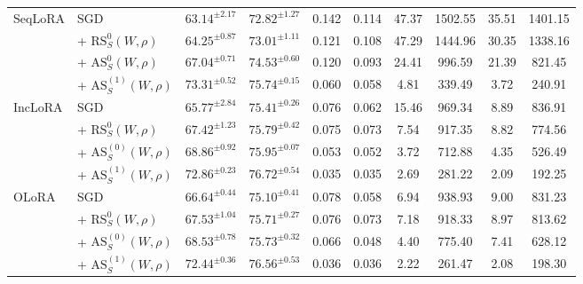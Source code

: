 \documentclass{article}
\theoremstyle{plain}
\theoremstyle{definition}
\theoremstyle{remark}
\begin{document}
{\begin{table}[ht]
{\begin{tabular}{@{}p{1.15cm} p{1.8cm} c c c c c c c c@{}}
\multirow{4}{*}{{SeqLoRA}}
& SGD    &$63.14^{\pm 2.17}$ & $72.82^{\pm 1.27}$  & 0.142  & 0.114 & 47.37 & 1502.55 & 35.51 & 1401.15 \\\
& + $\mathrm{RS}^{0}_S(W,\rho)$  &$64.25^{\pm 0.87}$ & $73.01^{\pm 1.11}$ &0.121 &0.108 &47.29 &1444.96 &30.35 &1338.16\\
& + $\mathrm{AS}^{0}_S(W,\rho)$    &$67.04^{\pm 0.71}$ & $74.53^{\pm 0.60}$ & 0.120  & 0.093 & 24.41   & 996.59   & 21.39  & 821.45   \\
 & + $\mathrm{AS}^{(1)}_S(W,\rho)$   &$73.31^{\pm 0.52}$ & $75.74^{\pm 0.15}$  & 0.060  &0.058  & 4.81    & 339.49   & 3.72   & 240.91   \\
\midrule
\multirow{4}{*}{{IncLoRA}}
& SGD    &$65.77^{\pm 2.84}$  &$75.41^{\pm 0.26}$ & 0.076    & 0.062 & 15.46 & 969.34  & 8.89  & 836.91 \\
& + $\mathrm{RS}^{0}_S(W,\rho)$ & $67.42^{\pm 1.23}$ & $75.79^{\pm 0.42}$  &0.075 &0.073 &7.54 &917.35 &8.82 &774.56\\
& + $\mathrm{AS}^{(0)}_S(W,\rho)$    &$68.86^{\pm 0.92}$ & $75.95^{\pm 0.07}$  & 0.053   & 0.052 & 3.72    & 712.88   & 4.35   & 526.49   \\
 &+ $\mathrm{AS}^{(1)}_S(W,\rho)$  &$72.86^{\pm 0.23}$ & $76.72^{\pm 0.54}$  & 0.035   & 0.035 & 2.69    & 281.22   & 2.09   & 192.25   \\
\midrule
\multirow{4}{*}{{OLoRA}}
& SGD    &$66.64^{\pm 0.44}$ & $75.10^{\pm 0.41}$  & 0.078   & 0.058 & 6.94    & 938.93   & 9.00   & 831.23   \\
& + $\mathrm{RS}^{0}_S(W,\rho)$  & $67.53^{\pm 1.04}$ & $75.71^{\pm 0.27}$  &0.076 &0.073 &7.18 &918.33 &8.97 &813.62\\
& + $\mathrm{AS}^{(0)}_S(W,\rho)$     &$68.53^{\pm 0.78}$ & $75.73^{\pm 0.32}$  & 0.066   & 0.048 & 4.40    & 775.40   & 7.41   & 628.12   \\
 & + $\mathrm{AS}^{(1)}_S(W,\rho)$  &$72.44^{\pm 0.36}$ & $76.56^{\pm 0.53}$  & 0.036   & 0.036 & 2.22    & 261.47   & 2.08   & 198.30\\
\bottomrule
\end{tabular}
}
\end{table}
} 
\end{document}
